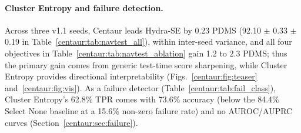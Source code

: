 \paragraph{Cluster Entropy and failure detection.} Across three v1.1 seeds, Centaur leads Hydra-SE by 0.23 PDMS (92.10 $\pm$ 0.33  $\pm$ 0.19 in Table~\ref{centaur:tab:navtest_all}), within inter-seed variance, and all four objectives in Table~\ref{centaur:tab:navtest_ablation} gain 1.2 to 2.3 PDMS; thus the primary gain comes from generic test-time score sharpening, while Cluster Entropy provides directional interpretability (Figs.~\ref{centaur:fig:teaser} and~\ref{centaur:fig:vis}). As a failure detector (Table~\ref{centaur:tab:fail_class}), Cluster Entropy's 62.8\% TPR comes with 73.6\% accuracy (below the 84.4\% Select None baseline at a 15.6\% non-zero failure rate) and no AUROC/AUPRC curves (Section~\ref{centaur:sec:failure}).

